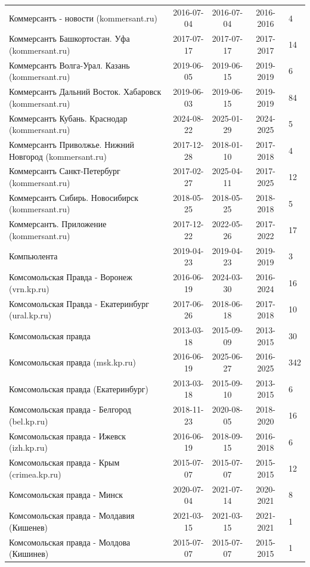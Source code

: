 \begin{longtable}{p{6cm}cccp{2cm}}
Коммерсантъ - новости (kommersant.ru) & 2016-07-04 & 2016-07-04 & 2016-2016 & 4\\
Коммерсантъ Башкортостан. Уфа (kommersant.ru) & 2017-07-17 & 2017-07-17 & 2017-2017 & 14\\
Коммерсантъ Волга-Урал. Казань (kommersant.ru) & 2019-06-05 & 2019-06-15 & 2019-2019 & 6\\
Коммерсантъ Дальний Восток. Хабаровск (kommersant.ru) & 2019-06-03 & 2019-06-15 & 2019-2019 & 84\\
Коммерсантъ Кубань. Краснодар (kommersant.ru) & 2024-08-22 & 2025-01-29 & 2024-2025 & 5\\
Коммерсантъ Приволжье. Нижний Новгород (kommersant.ru) & 2017-12-28 & 2018-01-10 & 2017-2018 & 4\\
Коммерсантъ Санкт-Петербург (kommersant.ru) & 2017-02-27 & 2025-04-11 & 2017-2025 & 12\\
Коммерсантъ Сибирь. Новосибирск (kommersant.ru) & 2018-05-25 & 2018-05-25 & 2018-2018 & 5\\
Коммерсантъ. Приложение (kommersant.ru) & 2017-12-22 & 2022-05-26 & 2017-2022 & 17\\
Компьюлента & 2019-04-23 & 2019-04-23 & 2019-2019 & 3\\
Комсомольская Правда - Воронеж (vrn.kp.ru) & 2016-06-19 & 2024-03-30 & 2016-2024 & 16\\
Комсомольская Правда - Екатеринбург (ural.kp.ru) & 2017-06-26 & 2018-06-18 & 2017-2018 & 10\\
Комсомольская правда & 2013-03-18 & 2015-09-09 & 2013-2015 & 30\\
Комсомольская правда (msk.kp.ru) & 2016-06-19 & 2025-06-27 & 2016-2025 & 342\\
Комсомольская правда (Екатеринбург) & 2013-03-18 & 2015-09-10 & 2013-2015 & 6\\
Комсомольская правда - Белгород (bel.kp.ru) & 2018-11-23 & 2020-08-05 & 2018-2020 & 16\\
Комсомольская правда - Ижевск (izh.kp.ru) & 2016-06-19 & 2018-09-15 & 2016-2018 & 6\\
Комсомольская правда - Крым (crimea.kp.ru) & 2015-07-07 & 2015-07-07 & 2015-2015 & 12\\
Комсомольская правда - Минск & 2020-07-04 & 2021-07-14 & 2020-2021 & 8\\
Комсомольская правда - Молдавия (Кишенев) & 2021-03-15 & 2021-03-15 & 2021-2021 & 1\\
Комсомольская правда - Молдова (Кишинев) & 2015-07-07 & 2015-07-07 & 2015-2015 & 1\\

\end{longtable}

